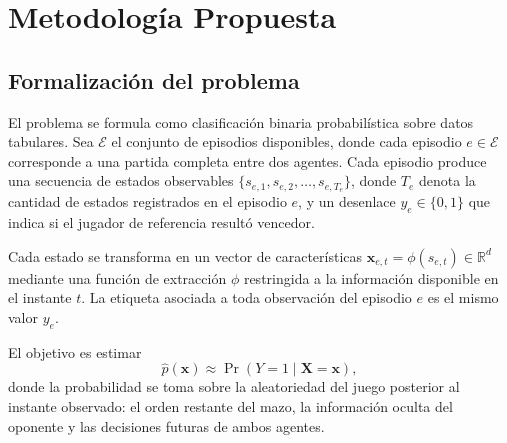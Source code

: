 %
%
\section{Metodología Propuesta}
\label{sec:metodologia}

\subsection{Formalización del problema}
\label{subsec:formalizacion}

El problema se formula como clasificación binaria probabilística sobre
datos tabulares. Sea $\mathcal{E}$ el conjunto de episodios disponibles,
donde cada episodio $e \in \mathcal{E}$ corresponde a una partida completa
entre dos agentes. Cada episodio produce una secuencia de estados
observables $\{s_{e,1}, s_{e,2}, \dots, s_{e,T_e}\}$, donde $T_e$ denota la
cantidad de estados registrados en el episodio $e$, y un desenlace
$y_e \in \{0,1\}$ que indica si el jugador de referencia resultó vencedor.

Cada estado se transforma en un vector de características
$\mathbf{x}_{e,t} = \phi(s_{e,t}) \in \mathbb{R}^d$ mediante una función de
extracción $\phi$ restringida a la información disponible en el instante
$t$. La etiqueta asociada a toda observación del episodio $e$ es el mismo
valor $y_e$.

El objetivo es estimar
\begin{equation}
\label{eq:objetivo}
\hat{p}(\mathbf{x}) \approx \Pr\!\left(Y = 1 \mid \mathbf{X} = \mathbf{x}\right),
\end{equation}
donde la probabilidad se toma sobre la aleatoriedad del juego posterior al
instante observado: el orden restante del mazo, la información oculta del
oponente y las decisiones futuras de ambos agentes.


